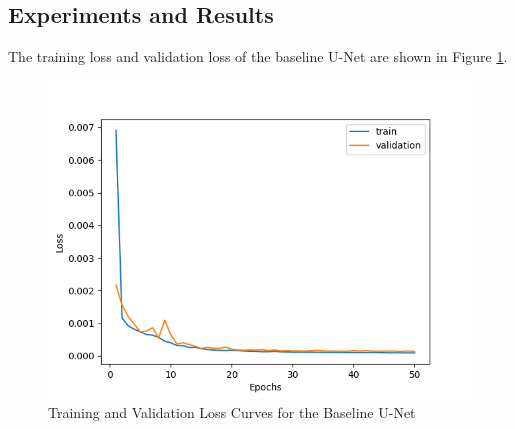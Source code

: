 \documentclass{article}
\begin{document}
\subsection{Experiments and Results}
The training loss and validation loss of the baseline U-Net are shown in Figure \ref{fig:baseline_unet_loss}.
\begin{figure}[H]
  \centering
  \includegraphics[width=\linewidth]{../result/baseline_unet.png}
  \caption{Training and Validation Loss Curves for the Baseline U-Net}
  \label{fig:baseline_unet_loss}
\end{figure}
\end{document}
